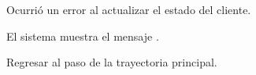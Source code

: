 {\begin{trayectoriaAlternativa}
  \end{trayectoriaAlternativa}

  \begin{trayectoriaAlternativa}
    {Ocurrió un error al actualizar el estado del cliente.}

    \item El sistema muestra el mensaje
      .

    \item Regresar al paso  de la
      trayectoria principal.

  \end{trayectoriaAlternativa}
}
